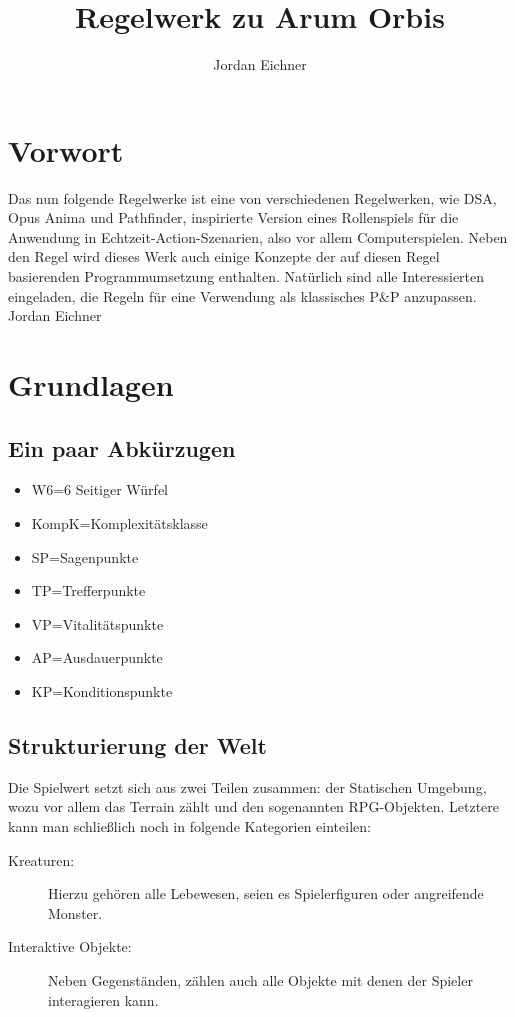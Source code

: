 \documentclass[a4paper,12pt,oneside]{book}
\author{Jordan Eichner}
\title{Regelwerk zu Arum Orbis}
\date{}
\begin{document}
\maketitle
\part*{Vorwort}
Das nun folgende Regelwerke ist eine von verschiedenen Regelwerken, wie DSA, Opus Anima und Pathfinder, inspirierte Version eines Rollenspiels für die Anwendung in Echtzeit-Action-Szenarien, also vor allem Computerspielen. Neben den Regel wird dieses Werk auch einige Konzepte der auf diesen Regel basierenden Programmumsetzung enthalten. Natürlich sind alle Interessierten eingeladen, die Regeln für eine Verwendung als klassisches P\&P anzupassen.
Jordan Eichner

\tableofcontents
  
\part{Grundlagen}
\chapter{Ein paar Abkürzugen}
\begin{itemize}
\item W6=6 Seitiger Würfel
\item KompK=Komplexitätsklasse
\item SP=Sagenpunkte
\item TP=Trefferpunkte
\item VP=Vitalitätspunkte
\item AP=Ausdauerpunkte
\item KP=Konditionspunkte

\end{itemize}

\chapter{Strukturierung der Welt}
Die Spielwert setzt sich aus zwei Teilen zusammen: der Statischen Umgebung, wozu vor allem das Terrain zählt und den sogenannten RPG-Objekten. Letztere kann man schließlich noch in folgende Kategorien einteilen:
\begin{description}
\item[Kreaturen:]
Hierzu gehören alle Lebewesen, seien es Spielerfiguren oder angreifende Monster.
\item[Interaktive Objekte:]
Neben Gegenständen, zählen auch alle Objekte mit denen der Spieler interagieren kann.
\end{description}
\end{document}
